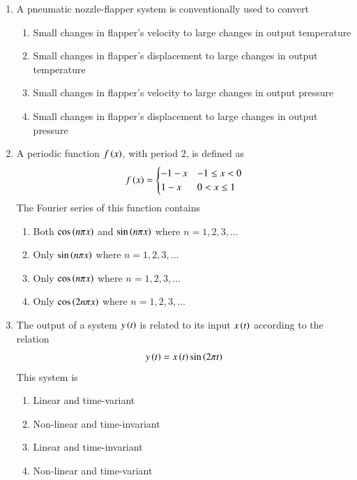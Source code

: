 \documentclass[journal,12pt,onecolumn]{IEEEtran}
\theoremstyle{remark}
\begin{document}
\begin{enumerate}
\item A pneumatic nozzle-flapper system is conventionally used to convert

\hfill{}
\begin{enumerate}
\item Small changes in flapper's velocity to large changes in output temperature
\item Small changes in flapper's displacement to large changes in output temperature
\item Small changes in flapper's velocity to large changes in output pressure
\item Small changes in flapper's displacement to large changes in output pressure
\end{enumerate}

\item A periodic function $f\left(x\right)$, with period $2$, is defined as
$$
f\left(x\right) = \begin{cases} -1 - x & -1 \le x < 0 \\ 1 - x & 0 < x \le 1 \end{cases}
$$
The Fourier series of this function contains \underline{\hspace{2cm}}

\hfill{}
\begin{enumerate}
\item Both $\cos \left(n\pi x\right)$ and $\sin \left(n\pi x\right)$ where $n = 1, 2, 3, \ldots$
\item Only $\sin \left(n\pi x\right)$ where $n = 1, 2, 3, \ldots$
\item Only $\cos \left(n\pi x\right)$ where $n = 1, 2, 3, \ldots$
\item Only $\cos \left(2n\pi x\right)$ where $n = 1, 2, 3, \ldots$
\end{enumerate}

\item The output of a system $y\left(t\right)$ is related to its input $x\left(t\right)$ according to the relation
$$
y\left(t\right) = x\left(t\right) \sin\left(2\pi t\right)
$$
This system is \underline{\hspace{2cm}}

\hfill{}
\begin{enumerate}
\item Linear and time-variant
\item Non-linear and time-invariant
\item Linear and time-invariant
\item Non-linear and time-variant
\end{enumerate}


\end{enumerate}
\end{document}
